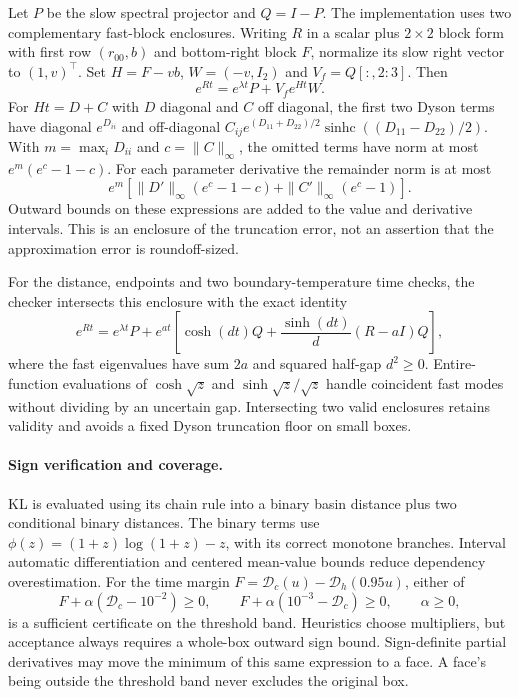 \documentclass[11pt]{article}
\begin{document}
Let $P$ be the slow spectral projector and $Q=I-P$.
The implementation uses two complementary fast-block enclosures.
Writing $R$ in a scalar plus $2\times2$ block form with first row
$(r_{00},b)$ and bottom-right block $F$, normalize its slow right
vector to $(1,v)^\top$. Set $H=F-vb$, $W=(-v,I_2)$ and
$V_f=Q[:,2:3]$. Then
\[
 e^{Rt}=e^{\lambda t}P+V_f e^{Ht}W.
\]
For $Ht=D+C$ with $D$ diagonal and $C$ off diagonal, the first two
Dyson terms have diagonal $e^{D_{ii}}$ and off-diagonal
$C_{ij}e^{(D_{11}+D_{22})/2}\operatorname{sinhc}((D_{11}-D_{22})/2)$.
With $m=\max_iD_{ii}$ and $c=\|C\|_\infty$, the omitted terms have norm
at most $e^m(e^c-1-c)$. For each parameter derivative the remainder norm
is at most
\[
 e^m\left[\|D'\|_\infty(e^c-1-c)
               +\|C'\|_\infty(e^c-1)\right].
\]
Outward bounds on these expressions are added to the value and derivative
intervals. This is an enclosure of the truncation error, not an assertion
that the approximation error is roundoff-sized.

For the distance, endpoints and two boundary-temperature time checks,
the checker intersects this enclosure with the exact identity
\[
 e^{Rt}=e^{\lambda t}P+
 e^{at}\left[\cosh(dt)Q+\frac{\sinh(dt)}{d}(R-aI)Q\right],
\]
where the fast eigenvalues have sum $2a$ and squared half-gap $d^2\geq0$.
Entire-function evaluations of $\cosh\sqrt z$ and
$\sinh\sqrt z/\sqrt z$ handle coincident fast modes without dividing by
an uncertain gap. Intersecting two valid enclosures retains validity and
avoids a fixed Dyson truncation floor on small boxes.

\paragraph{Sign verification and coverage.}
KL is evaluated using its chain rule into a binary basin distance plus
two conditional binary distances. The binary terms use
$\phi(z)=(1+z)\log(1+z)-z$, with its correct monotone branches.
Interval automatic differentiation and centered mean-value bounds reduce
dependency overestimation. For the time margin
$F=\mathcal D_c(u)-\mathcal D_h(0.95u)$, either of
\[
 F+\alpha(\mathcal D_c-10^{-2})\geq0,
 \qquad F+\alpha(10^{-3}-\mathcal D_c)\geq0,
 \qquad\alpha\geq0,
\]
is a sufficient certificate on the threshold band. Heuristics choose
multipliers, but acceptance always requires a whole-box outward sign
bound. Sign-definite partial derivatives may move the minimum of this
same expression to a face. A face's being outside the threshold band
never excludes the original box.
\end{document}
